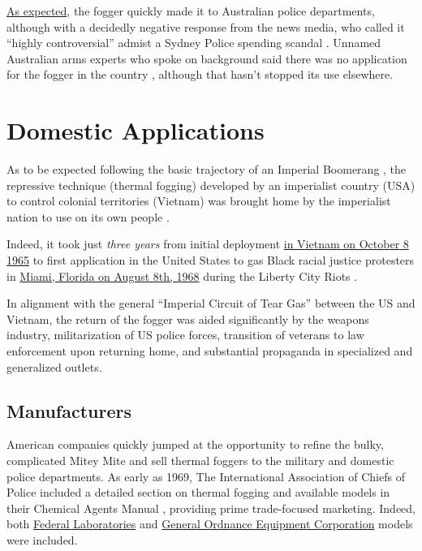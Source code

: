 \documentclass[
  11pt,
  titlepage]{krantz}
\begin{document}
\protect\hyperlink{TheReturn}{As expected}, the fogger quickly made it to Australian police departments, although with a decidedly negative response from the news media, who called it ``highly controversial'' admist a Sydney Police spending scandal \citep{Allen1972}.
Unnamed Australian arms experts who spoke on background said there was no application for the fogger in the country \citep{Allen1972}, although that hasn't stopped its use elsewhere.

\hypertarget{TheReturn}{%
\chapter*{Domestic Applications}\label{TheReturn}}


As to be expected following the basic trajectory of an Imperial Boomerang \citep{Cesaire1950, Arendt1951, Foucault1976}, the repressive technique (thermal fogging) developed by an imperialist country (USA) to control colonial territories (Vietnam) was brought home by the imperialist nation to use on its own people \citep{Graham2013}.

Indeed, it took just \emph{three years} from initial deployment \protect\hyperlink{FirstUse}{in Vietnam on October 8 1965} to first application in the United States to gas Black racial justice protesters in \protect\hyperlink{MiamiFL1968_08_08}{Miami, Florida on August 8th, 1968} during the Liberty City Riots \citep{Tschenschlok1995, Lorentzen2018}.

In alignment with the general ``Imperial Circuit of Tear Gas'' \citep{Schrader2019} between the US and Vietnam, the return of the fogger was aided significantly by the weapons industry, militarization of US police forces, transition of veterans to law enforcement upon returning home, and substantial propaganda in specialized and generalized outlets.

\hypertarget{manufacturers}{%
\section*{Manufacturers}\label{manufacturers}}


American companies quickly jumped at the opportunity to refine the bulky, complicated Mitey Mite and sell thermal foggers to the military and domestic police departments.
As early as 1969, The International Association of Chiefs of Police included a detailed section on thermal fogging and available models in their Chemical Agents Manual \citep{Crockett1969}, providing prime trade-focused marketing.
Indeed, both \protect\hyperlink{FederalLaboratories}{Federal Laboratories} and \protect\hyperlink{GOEC}{General Ordnance Equipment Corporation} models were included.
\end{document}

